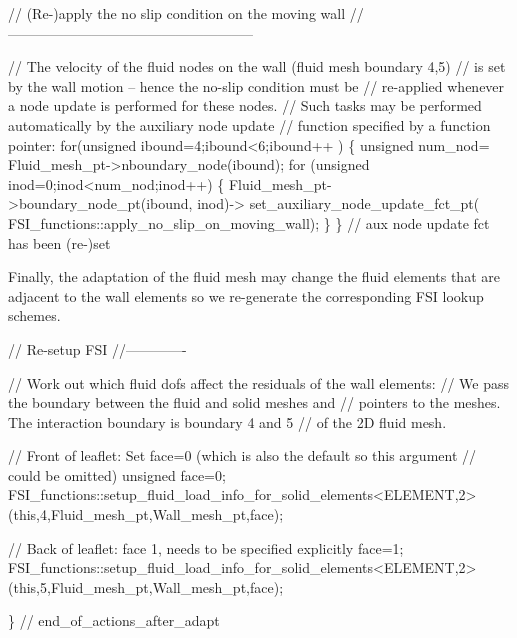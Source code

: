 \begin{DoxyCodeInclude}
 

 \textcolor{comment}{// (Re-)apply the no slip condition on the moving wall}
 \textcolor{comment}{//-----------------------------------------------------}

 \textcolor{comment}{// The velocity of the fluid nodes on the wall (fluid mesh boundary 4,5)}
 \textcolor{comment}{// is set by the wall motion -- hence the no-slip condition must be}
 \textcolor{comment}{// re-applied whenever a node update is performed for these nodes. }
 \textcolor{comment}{// Such tasks may be performed automatically by the auxiliary node update }
 \textcolor{comment}{// function specified by a function pointer:}
 \textcolor{keywordflow}{for}(\textcolor{keywordtype}{unsigned} ibound=4;ibound<6;ibound++ )
  \{ 
   \textcolor{keywordtype}{unsigned} num\_nod= Fluid\_mesh\_pt->nboundary\_node(ibound);
   \textcolor{keywordflow}{for} (\textcolor{keywordtype}{unsigned} inod=0;inod<num\_nod;inod++)
    \{   
     Fluid\_mesh\_pt->boundary\_node\_pt(ibound, inod)->
      set\_auxiliary\_node\_update\_fct\_pt(
       FSI\_functions::apply\_no\_slip\_on\_moving\_wall);
    \}
  \} \textcolor{comment}{// aux node update fct has been (re-)set}

\end{DoxyCodeInclude}


Finally, the adaptation of the fluid mesh may change the fluid elements that are adjacent to the wall elements so we re-\/generate the corresponding F\+SI lookup schemes.


\begin{DoxyCodeInclude}

 
 
 \textcolor{comment}{// Re-setup FSI}
 \textcolor{comment}{//-------------}
 
 \textcolor{comment}{// Work out which fluid dofs affect the residuals of the wall elements:}
 \textcolor{comment}{// We pass the boundary between the fluid and solid meshes and }
 \textcolor{comment}{// pointers to the meshes. The interaction boundary is boundary 4 and 5}
 \textcolor{comment}{// of the 2D fluid mesh.}

 \textcolor{comment}{// Front of leaflet: Set face=0 (which is also the default so this argument}
 \textcolor{comment}{// could be omitted)}
 \textcolor{keywordtype}{unsigned} face=0; 
 FSI\_functions::setup\_fluid\_load\_info\_for\_solid\_elements<ELEMENT,2>
  (\textcolor{keyword}{this},4,Fluid\_mesh\_pt,Wall\_mesh\_pt,face); 
 
 \textcolor{comment}{// Back of leaflet: face 1, needs to be specified explicitly}
 face=1; 
 FSI\_functions::setup\_fluid\_load\_info\_for\_solid\_elements<ELEMENT,2>
  (\textcolor{keyword}{this},5,Fluid\_mesh\_pt,Wall\_mesh\_pt,face); 
  
\} \textcolor{comment}{// end\_of\_actions\_after\_adapt}

\end{DoxyCodeInclude}




